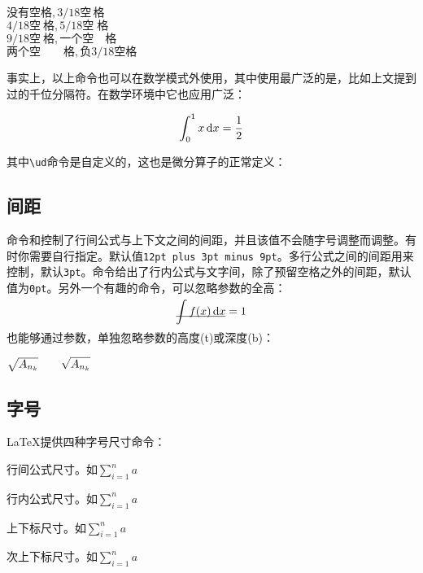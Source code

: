 \begin{codeshow}
  $没有空格,3/18空\,格$ \\
  $4/18空\:格,5/18空\;格$ \\
  $9/18空\ 格,一个空\quad 格$ \\
  $两个空\qquad 格,负3/18空\!格$
\end{codeshow}

事实上，以上命令也可以在数学模式外使用，其中使用最广泛的是\latexline{,}，比如上文提到过的千位分隔符。在数学环境中它也应用广泛：

\begin{codeshow}
\[ \int_0^1 x \ud{}x
= \frac{1}{2} \]
\end{codeshow}

其中\verb|\ud|命令是自定义的，这也是微分算子的正常定义\label{cmd:ud}：
\begin{latex}
\newcommand{\ud}{\mathop{}\negthinspace\mathrm{d}}
\end{latex}

\subsection{间距}
命令和控制了行间公式与上下文之间的间距，并且该值不会随字号调整而调整。有时你需要自行指定。默认值\texttt{12pt plus 3pt minus 9pt}。多行公式之间的间距用来控制，默认\texttt{3pt}。命令给出了行内公式与文字间，除了预留空格之外的间距，默认值为\texttt{0pt}。另外一个有趣的命令，可以忽略参数的全高：
\begin{codeshow}
\[\underline{\smash{\int f(x)\ud x}}=1\]
\end{codeshow}

也能够通过参数，单独忽略参数的高度(t)或深度(b)：
\begin{codeshow}
$\sqrt{A_{n_k}} \qquad
\sqrt{\smash[b]{A_{n_k}}}$
\end{codeshow}

\subsection{字号}
\LaTeX{}提供四种字号尺寸命令：
\begin{para}
\item[\latexline{displaystyle}] 行间公式尺寸。如$\displaystyle \sum_{i=1}^n a$
\item[\latexline{textstyle}] 行内公式尺寸。如$\textstyle \sum_{i=1}^n a$
\item[\latexline{scriptstyle}] 上下标尺寸。如$\scriptstyle \sum_{i=1}^n a$
\item[\latexline{scriptscriptstyle}] 次上下标尺寸。如$\scriptscriptstyle \sum_{i=1}^n a$
\end{para}

